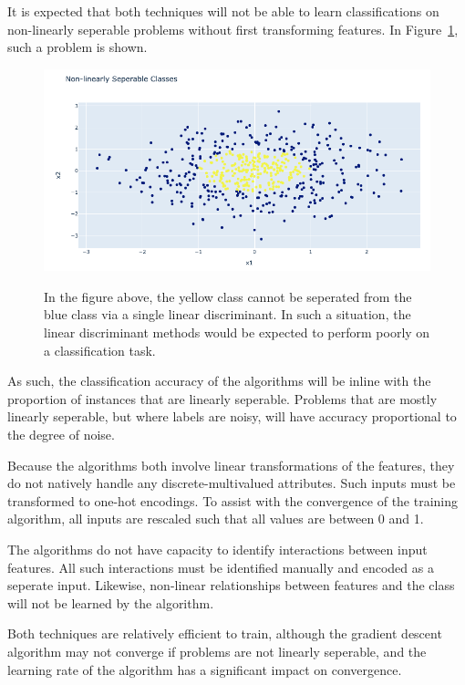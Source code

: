 \documentclass{amsart}
\begin{document}
    It is expected that both techniques will not be able to learn
    classifications on non-linearly seperable problems without
    first transforming features. In Figure~\ref{nonseperable_classes},
    such a problem is shown.
    \begin{figure}[H]
        \centering
        \includegraphics[width=.9 \textwidth]{non-seperable.png}
        \label{nonseperable_classes}
        \caption{In the figure above, the yellow class cannot be seperated from the
        blue class via a single linear discriminant. In such a situation,
        the linear discriminant methods would be expected to perform
        poorly on a classification task.
        }
    \end{figure}
    As such, the classification accuracy of the algorithms will be inline with
    the proportion of instances that are linearly seperable. Problems that are
    mostly linearly seperable, but where labels are noisy, will have accuracy proportional
    to the degree of noise.

    Because the algorithms both involve linear transformations of the
    features, they do not natively handle any discrete-multivalued attributes.
    Such inputs must be transformed to one-hot encodings. To assist with the
    convergence of the training algorithm, all inputs are rescaled such
    that all values are between 0 and 1.

    The algorithms do not have capacity to identify interactions between
    input features. All such interactions must be identified manually and encoded
    as a seperate input. Likewise,
    non-linear relationships between features and the class
    will not be learned by the algorithm.

    Both techniques are relatively efficient to train, although the
    gradient descent algorithm may not converge if problems are not linearly
    seperable, and the learning rate of the algorithm has a significant impact on convergence.
\end{document}
